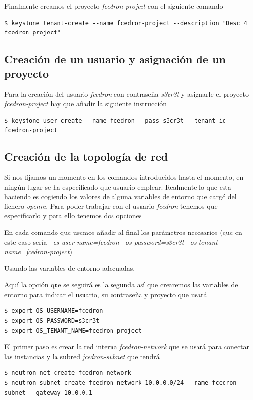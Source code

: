 \documentclass{article}
\begin{document}
	Finalmente creamos el proyecto \emph{fcedron-project} con el siguiente comando	
\begin{lstlisting}[style=miniBash]
$ keystone tenant-create --name fcedron-project --description "Desc 4 fcedron-project"

\end{lstlisting}	

\subsection{Creación de un usuario y asignación de un proyecto}

	Para la creación del usuario \emph{fcedron} con contraseña \emph{s3cr3t} y asignarle el proyecto \emph{fcedron-project} hay que añadir la siguiente instrucción
\begin{lstlisting}[style=miniBash]
$ keystone user-create --name fcedron --pass s3cr3t --tenant-id fcedron-project

\end{lstlisting}	

\subsection{Creación de la topología de red}
	Si nos fijamos un momento en los comandos introducidos hasta el momento, en ningún lugar se ha especificado que usuario emplear. Realmente lo que esta haciendo es cogiendo los valores de alguna variables de entorno que cargó del fichero \emph{openrc}. Para poder trabajar con el usuario \emph{fcedron} tenemos que especificarlo y para ello tenemos dos opciones
\begin{enumerate}
{\setlength{\parskip}{0mm}
	\item En cada comando que usemos añadir al final los parámetros necesarios (que en este caso sería \emph{--os-user-name=fcedron --os-password=s3cr3t --os-tenant-name=fcedron-project})
	\item Usando las variables de entorno adecuadas.
}
\end{enumerate}
	Aquí la opción que se seguirá es la segunda así que crearemos las variables de entorno para indicar el usuario, su contraseña y proyecto que usará
\begin{lstlisting}[style=miniBash]
$ export OS_USERNAME=fcedron
$ export OS_PASSWORD=s3cr3t
$ export OS_TENANT_NAME=fcedron-project
\end{lstlisting}

	El primer paso es crear la red interna \emph{fcedron-network} que se usará para conectar las instancias y la subred \emph{fcedron-subnet} que tendrá\cite{NetworkingCLIOpenStack}
\begin{lstlisting}[style=miniBash]
$ neutron net-create fcedron-network
$ neutron subnet-create fcedron-network 10.0.0.0/24 --name fcedron-subnet --gateway 10.0.0.1
\end{lstlisting}
\end{document}
